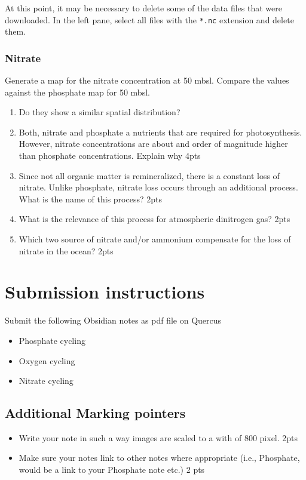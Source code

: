 \documentclass[11pt]{article}
\begin{document}
At this point, it may be necessary to delete some of the data files that were downloaded. In the left pane, select all files with the \texttt{*.nc} extension and delete them.

\subsubsection{Nitrate}
\label{sec:org87c6adc}

Generate a map for the nitrate concentration at 50 mbsl. Compare the values against the phosphate map for 50 mbsl.  
\begin{enumerate}
\item Do they show a similar spatial distribution?
\item Both, nitrate and phosphate a nutrients that  are required for photosynthesis.  However, nitrate concentrations are about and order of magnitude higher than phosphate concentrations. Explain why 4pts
\item Since not all organic matter is remineralized, there is a constant loss of nitrate. Unlike phosphate, nitrate loss occurs through an additional process. What is the name of this process? 2pts
\item What is the relevance of this process for atmospheric dinitrogen gas? 2pts
\item Which two source of nitrate and/or ammonium compensate for the loss of nitrate in the ocean? 2pts
\end{enumerate}

\section{Submission instructions}
\label{sec:org52952a8}

Submit the following Obsidian notes as pdf file on Quercus

\begin{itemize}
\item Phosphate cycling
\item Oxygen cycling
\item Nitrate cycling
\end{itemize}

\subsection{Additional Marking pointers}
\label{sec:orgd1b330a}

\begin{itemize}
\item Write your note in such a way  images are scaled to a with of 800 pixel. 2pts
\item Make sure your notes link to other notes where appropriate (i.e., Phosphate, would be a link to your Phosphate note etc.) 2 pts
\end{itemize}
\end{document}
